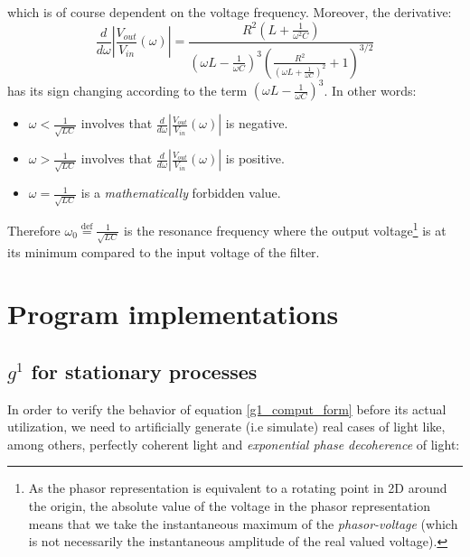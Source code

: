 \documentclass[11pt]{report}
\begin{document}
which is of course dependent on the voltage frequency. Moreover, the derivative:
\begin{equation}
\frac{d}{d\omega} \left\vert \frac{V_{out}}{V_{in}}(\omega) \right\vert = \frac{R^2\left(L + \frac{1}{\omega^2C}\right)}{\left(\omega L - \frac{1}{\omega C}\right)^3\left(\frac{R^2}{\left(\omega L + \frac{1}{\omega C}\right)^2} + 1\right)^{3/2}}
\end{equation}
has its sign changing according to the term $\left(\omega L - \frac{1}{\omega C}\right)^3$. In other words:
\begin{itemize}
	\item $\omega < \frac{1}{\sqrt{LC}}$ involves that $\frac{d}{d\omega} \left\vert \frac{V_{out}}{V_{in}}(\omega) \right\vert$ is negative.
	\item $\omega > \frac{1}{\sqrt{LC}}$ involves that $\frac{d}{d\omega} \left\vert \frac{V_{out}}{V_{in}}(\omega) \right\vert$ is positive.
	\item $\omega = \frac{1}{\sqrt{LC}}$ is a \textit{mathematically} forbidden value.
\end{itemize}
Therefore $\omega_0 \stackrel{\text{def}}{=} \frac{1}{\sqrt{LC}}$ is the resonance frequency where the output voltage\footnote{As the phasor representation is equivalent to a rotating point in 2D around the origin, the absolute value of the voltage in the phasor representation means that we take the instantaneous maximum of the \textit{phasor-voltage} (which is not necessarily the instantaneous amplitude of the real valued voltage).} is at its minimum compared to the input voltage of the filter.

\chapter{Program implementations}
\label{prog_impl}

\section{$g^1$ for stationary processes}

In order to verify the behavior of equation \eqref{g1_comput_form} before its actual utilization, we need to artificially generate (i.e simulate) real cases of light like, among others, perfectly coherent light and \textit{exponential phase decoherence} of light:
\end{document}
